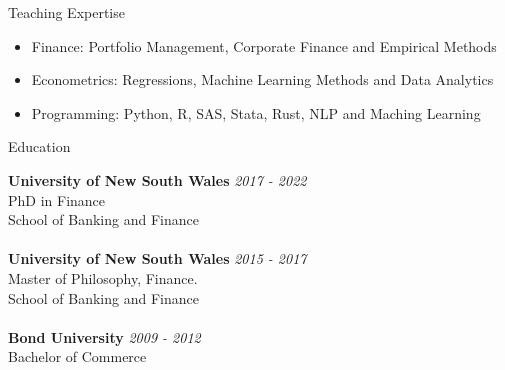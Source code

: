 \documentclass{resume} %
\begin{document}


\begin{rSection}{Teaching Expertise}
	\begin{itemize}
		\item Finance: Portfolio Management, Corporate Finance and Empirical Methods
		\item Econometrics: Regressions, Machine Learning Methods and Data Analytics
		\item Programming: Python, R, SAS, Stata, Rust, NLP and Maching Learning
	\end{itemize}
\end{rSection}
\begin{rSection}{Education}

	{\bf University of New South Wales} \hfill {\em 2017 - 2022}
	\\ PhD in Finance
	\\ School of Banking and Finance\\
	\\{\bf University of New South Wales} \hfill {\em 2015 - 2017}
	\\ Master of Philosophy, Finance.
	\\ School of Banking and Finance
	\\
	\\{\bf Bond University} \hfill {\em 2009 - 2012}
	\\ Bachelor of Commerce
\end{rSection}
\end{document}
